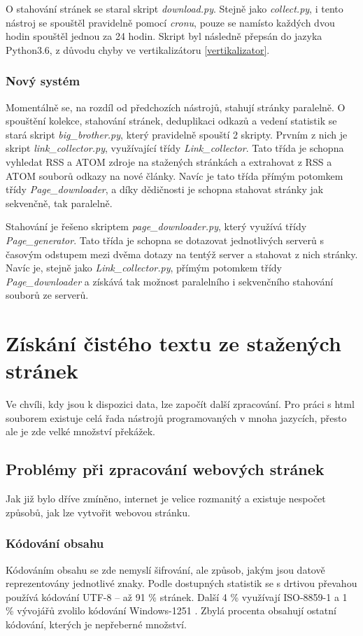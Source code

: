 O stahování stránek se staral skript \textit{download.py}. Stejně jako \textit{collect.py}, i tento nástroj se spouštěl pravidelně
pomocí \textit{cronu}, pouze se namísto každých dvou hodin spouštěl jednou za 24 hodin. Skript byl následně přepsán do jazyka Python3.6,
z důvodu chyby ve vertikalizátoru \ref{vertikalizator}.

\subsection{Nový systém}
Momentálně se, na rozdíl od předchozích nástrojů, stahují stránky paralelně. O spouštění kolekce, stahování stránek, deduplikaci odkazů a vedení statistik se
stará skript \textit{big\_brother.py}, který pravidelně spouští 2 skripty. Prvním z nich je skript \textit{link\_collector.py}, využívající třídy \textit{Link\_collector}.
Tato třída je schopna vyhledat RSS a ATOM zdroje na stažených stránkách a extrahovat z RSS a ATOM souborů odkazy na nové články.
Navíc je tato třída přímým potomkem třídy \textit{Page\_downloader}, a díky dědičnosti je schopna stahovat stránky jak sekvenčně, tak paralelně.

Stahování je řešeno skriptem \textit{page\_downloader.py}, který využívá třídy \textit{Page\_generator}. Tato třída je schopna se dotazovat jednotlivých serverů
s časovým odstupem mezi dvěma dotazy na tentýž server a stahovat z nich stránky. Navíc je, stejně jako \textit{Link\_collector.py}, přímým potomkem
třídy \textit{Page\_downloader} a získává tak možnost paralelního i sekvenčního stahování souborů ze serverů.

\chapter{Získání čistého textu ze stažených stránek}
\label{cisty_text}
Ve chvíli, kdy jsou k dispozici data, lze započít další zpracování. Pro práci s html souborem existuje celá řada nástrojů
programovaných v mnoha jazycích, přesto ale je zde velké množství překážek.

\section{Problémy při zpracování webových stránek}
Jak již bylo dříve zmíněno, internet je velice rozmanitý a existuje nespočet způsobů, jak lze vytvořit webovou stránku.

\subsection{Kódování obsahu}
Kódováním obsahu se zde nemyslí šifrování, ale způsob, jakým jsou datově reprezentovány jednotlivé znaky. Podle dostupných
statistik se s drtivou převahou používá kódování UTF-8 -- až 91 \% stránek. Další 4 \% využívají ISO-8859-1 a 1 \%
vývojářů zvolilo kódování Windows-1251 \cite{W3TECHS}. Zbylá procenta obsahují ostatní kódování, kterých je nepřeberné množství.

